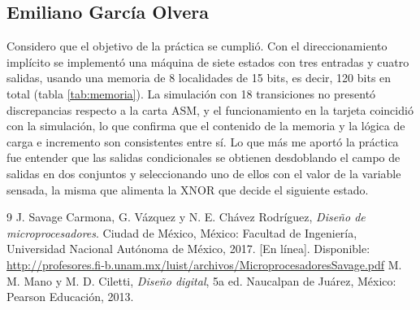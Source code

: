 \subsection{Emiliano García Olvera}

Considero que el objetivo de la práctica se cumplió. Con el direccionamiento implícito se implementó
una máquina de siete estados con tres entradas y cuatro salidas, usando una memoria de 8 localidades
de 15 bits, es decir, 120 bits en total (tabla \ref{tab:memoria}). La simulación con 18 transiciones
no presentó discrepancias respecto a la carta ASM, y el funcionamiento en la tarjeta coincidió con la
simulación, lo que confirma que el contenido de la memoria y la lógica de carga e incremento son
consistentes entre sí. Lo que más me aportó la práctica fue entender que las salidas condicionales se
obtienen desdoblando el campo de salidas en dos conjuntos y seleccionando uno de ellos con el valor de
la variable sensada, la misma que alimenta la XNOR que decide el siguiente estado.

\renewcommand{\refname}{Bibliografía}
\begin{thebibliography}{9}
 J. Savage Carmona, G. Vázquez y N. E. Chávez Rodríguez,
  \emph{Diseño de microprocesadores}. Ciudad de México, México: Facultad de Ingeniería,
  Universidad Nacional Autónoma de México, 2017. [En línea]. Disponible:
  \url{http://profesores.fi-b.unam.mx/luist/archivos/MicroprocesadoresSavage.pdf}
 M. M. Mano y M. D. Ciletti, \emph{Diseño digital}, 5a ed.
  Naucalpan de Juárez, México: Pearson Educación, 2013.
\end{thebibliography}

